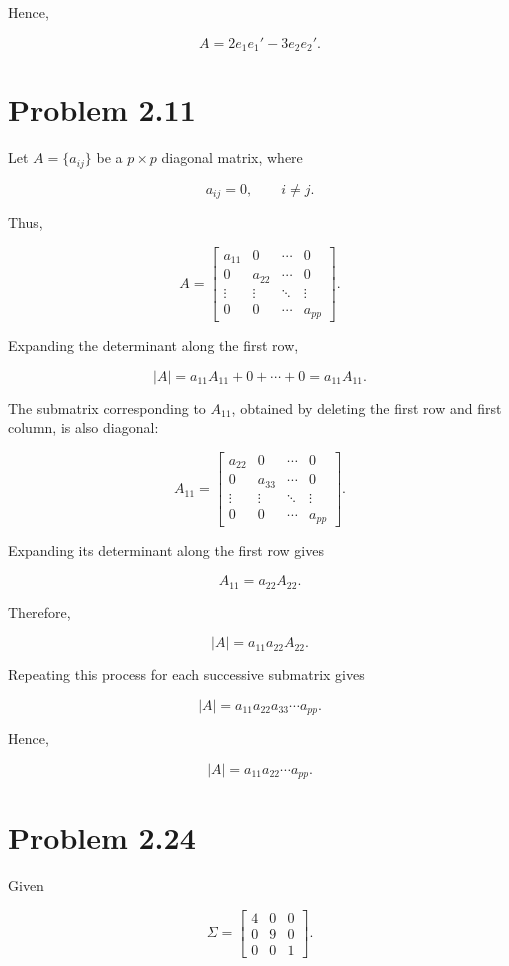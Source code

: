 \documentclass[12pt]{article}
\begin{document}
Hence,

\[
\boxed{
A=2e_1e_1'-3e_2e_2'
}.
\]


\section*{Problem 2.11}

Let $A=\{a_{ij}\}$ be a $p\times p$ diagonal matrix, where

\[
a_{ij}=0,\qquad i\neq j.
\]

Thus,

\[
A=
\begin{bmatrix}
a_{11}&0&\cdots&0\\
0&a_{22}&\cdots&0\\
\vdots&\vdots&\ddots&\vdots\\
0&0&\cdots&a_{pp}
\end{bmatrix}.
\]

Expanding the determinant along the first row,

\[
|A|
=
a_{11}A_{11}+0+\cdots+0
=
a_{11}A_{11}.
\]

The submatrix corresponding to $A_{11}$, obtained by deleting the first row and first column, is also diagonal:

\[
A_{11}
=
\begin{bmatrix}
a_{22}&0&\cdots&0\\
0&a_{33}&\cdots&0\\
\vdots&\vdots&\ddots&\vdots\\
0&0&\cdots&a_{pp}
\end{bmatrix}.
\]

Expanding its determinant along the first row gives

\[
A_{11}=a_{22}A_{22}.
\]

Therefore,

\[
|A|=a_{11}a_{22}A_{22}.
\]

Repeating this process for each successive submatrix gives

\[
|A|
=
a_{11}a_{22}a_{33}\cdots a_{pp}.
\]

Hence,

\[
\boxed{
|A|=a_{11}a_{22}\cdots a_{pp}
}.
\]


\section*{Problem 2.24}

Given

\[
\Sigma=
\begin{bmatrix}
4&0&0\\
0&9&0\\
0&0&1
\end{bmatrix}.
\]
\end{document}
